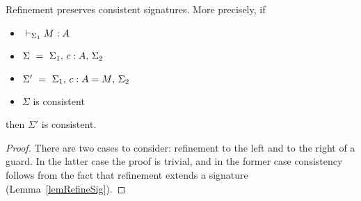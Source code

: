 \begin{lemma} \label{lemRefineConsistent}
    Refinement preserves consistent signatures.
\if {}
    More precisely, if
    \begin{itemize}
	\item ${} \vdash_{\Sigma_1} {M} : {A}$
	\item $\Sigma ~ = ~ {\Sigma_1},\,{} {{c} : {A}},\,{} \Sigma_2$
	\item $\Sigma' ~ = ~ {\Sigma_1},\,{} {{c} : {A} = {M}},\,{} \Sigma_2$
	\item $\Sigma$ is consistent
    \end{itemize}
    then $\Sigma'$ is consistent.
\fi
\end{lemma}

\if {}
\begin{proof}
    There are two cases to consider: refinement to the left and to the right of
    a guard. In the latter case the proof is trivial, and in the former case
    consistency follows from the fact that refinement extends a signature
    (Lemma~\ref{lemRefineSig}).
\end{proof}
\fi

